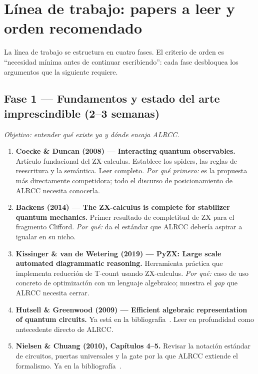 \documentclass[12pt, a4paper]{article}
\begin{document}
\section{Línea de trabajo: papers a leer y orden recomendado}

La línea de trabajo se estructura en cuatro fases. El criterio de orden es
``necesidad mínima antes de continuar escribiendo'': cada fase desbloquea
los argumentos que la siguiente requiere.

\subsection*{Fase 1 — Fundamentos y estado del arte imprescindible (2--3 semanas)}

\textit{Objetivo: entender qué existe ya y dónde encaja ALRCC.}

\begin{enumerate}
  \item[\checkmark] \textbf{Coecke \& Duncan (2008) --- Interacting quantum observables.}
        Artículo fundacional del ZX-calculus. Establece los spiders, las
        reglas de reescritura y la semántica. Leer completo.
        \textit{Por qué primero:} es la propuesta más directamente competidora;
        todo el discurso de posicionamiento de ALRCC necesita conocerla.

  \item \textbf{Backens (2014) --- The ZX-calculus is complete for stabilizer quantum mechanics.}
        Primer resultado de completitud de ZX para el fragmento Clifford.
        \textit{Por qué:} da el estándar que ALRCC debería aspirar a igualar
        en su nicho.

  \item \textbf{Kissinger \& van de Wetering (2019) --- PyZX: Large scale automated diagrammatic reasoning.}
        Herramienta práctica que implementa reducción de T-count usando
        ZX-calculus.
        \textit{Por qué:} caso de uso concreto de optimización con un lenguaje
        algebraico; muestra el \emph{gap} que ALRCC necesita cerrar.

  \item \textbf{Hutsell \& Greenwood (2009) --- Efficient algebraic representation of quantum circuits.}
        Ya está en la bibliografía~\cite{Hutsell}. Leer en profundidad como
        antecedente directo de ALRCC.

  \item[\checkmark] \textbf{Nielsen \& Chuang (2010), Capítulos 4--5.}
        Revisar la notación estándar de circuitos, puertas universales y la
        gate por la que ALRCC extiende el formalismo. Ya en la
        bibliografía~\cite{NielsenChuang}.
\end{enumerate}
\end{document}
